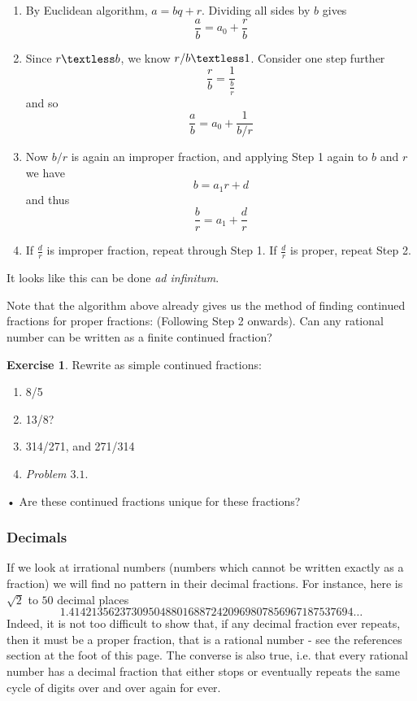 \documentclass[12pt]{amsart}
\theoremstyle{definition}
\newtheorem{xca}[theorem]{Exercise}
\theoremstyle{remark}
\numberwithin{equation}{section}
\begin{document}
\begin{enumerate}
\item By Euclidean algorithm, $a=bq+r$. Dividing all sides by $b$ gives
\[\frac{a}{b}=a_0+\frac{r}{b}\]
\item Since $r\textless b$, we know $r/b\textless 1$. Consider one step further \[ \frac{r}{b}=\frac{1}{\frac{b}{r}}\] and so \[ \frac{a}{b}=a_0+ \frac{1}{b/r}\] 
\item  Now $b/r$ is again an improper fraction, and applying Step 1 again to $b$ and $r$ we have
\[b=a_1r+d\] and thus  \[\frac{b}{r}=a_1+\frac{d}{r}\]



\item If $\frac{d}{r}$ is improper fraction, repeat through Step 1. If $\frac{d}{r}$ is proper, repeat Step 2.
\end{enumerate}

It looks like this can be done \textit{ad infinitum}.

Note that the algorithm above already gives us the method of finding continued fractions for proper fractions: (Following Step 2 onwards). Can any rational number can be written as a finite continued fraction?

\begin{xca}
Rewrite as simple continued fractions:
\begin{enumerate}
\item 8/5
\item 13/8?
\item 314/271, and 271/314
\item \textit{Problem $3.1$}.
\end{enumerate}•
Are these continued fractions unique for these fractions?
\end{xca}

\subsubsection{Decimals} 

If we look at irrational numbers (numbers which cannot be written exactly as a fraction) we will find no pattern in their decimal fractions. For instance, here is $\sqrt{2}$ to $50$ decimal places 
$$1.41421 35623 73095 04880 16887 24209 69807 85696 71875 37694\ldots$$
Indeed, it is not too difficult to show that, if any decimal fraction ever repeats, then it must be a proper fraction, that is a rational number - see the references section at the foot of this page.
The converse is also true, i.e. that every rational number has a decimal fraction that either stops or eventually repeats the same cycle of digits over and over again for ever.
\end{document}
